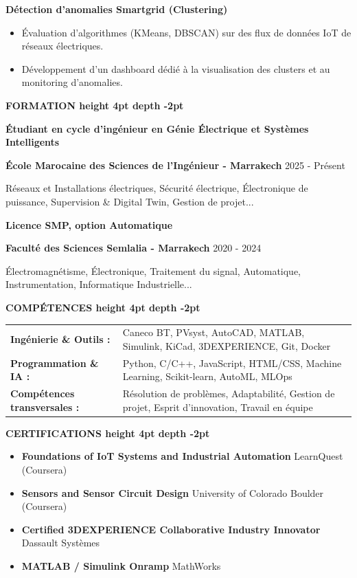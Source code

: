 \documentclass[10pt,a4paper]{altacv}
\renewcommand{\cvsection}[2][]{%
  \vspace{3pt}%
  {\color{heading}\LARGE\bfseries #2 \hspace{0.2em}\leaders\vrule height 4pt depth -2pt\hfill\mbox{}}\par\vspace{2pt}
}
\renewcommand{\cvevent}[4]{%
  {\large\bfseries\color{accent}#1\par}
  \vspace{1pt}\normalsize
  \ifstrequal{#2}{}{}{%
    \textbf{\color{emphasis}#2\ifstrequal{#4}{}{}{ - #4}}%
  }%
  \hfill
  \ifstrequal{#3}{}{}{{\small#3}}%
  \par\vspace{1pt}
}
\begin{document}
{\large\bfseries\color{accent} Détection d'anomalies Smartgrid (Clustering)}\\[0.05cm]
\begin{itemize}
  \item Évaluation d'algorithmes (KMeans, DBSCAN) sur des flux de données IoT de réseaux électriques.
  \item Développement d'un dashboard dédié à la visualisation des clusters et au monitoring d'anomalies.
\end{itemize}

\cvsection{FORMATION}
\cvevent{Étudiant en cycle d'ingénieur en Génie Électrique et Systèmes Intelligents}{École Marocaine des Sciences de l'Ingénieur}{2025 - Présent}{Marrakech}
\small Réseaux et Installations électriques, Sécurité électrique, Électronique de puissance, Supervision \& Digital Twin, Gestion de projet...

\cvevent{Licence SMP, option Automatique}{Faculté des Sciences Semlalia}{2020 - 2024}{Marrakech}
\small Électromagnétisme, Électronique, Traitement du signal, Automatique, Instrumentation, Informatique Industrielle...

\cvsection{COMPÉTENCES}
\begin{tabular}{@{}ll@{}}
\textbf{Ingénierie \& Outils :} & Caneco BT, PVsyst, AutoCAD, MATLAB, Simulink, KiCad, 3DEXPERIENCE, Git, Docker \\[2pt]
\textbf{Programmation \& IA :} & Python, C/C++, JavaScript, HTML/CSS, Machine Learning, Scikit-learn, AutoML, MLOps \\[2pt]
\textbf{Compétences transversales :} & Résolution de problèmes, Adaptabilité, Gestion de projet, Esprit d'innovation, Travail en équipe \\
\end{tabular}

\cvsection{CERTIFICATIONS}
\begin{itemize}[leftmargin=*, label=\textbullet, itemsep=2pt]
  \item \textbf{Foundations of IoT Systems and Industrial Automation} \hfill {\color{emphasis}LearnQuest (Coursera)}
  \item \textbf{Sensors and Sensor Circuit Design} \hfill {\color{emphasis}University of Colorado Boulder (Coursera)}
  \item \textbf{Certified 3DEXPERIENCE Collaborative Industry Innovator} \hfill {\color{emphasis}Dassault Systèmes}
  \item \textbf{MATLAB / Simulink Onramp} \hfill {\color{emphasis}MathWorks}
\end{itemize}
\end{document}
